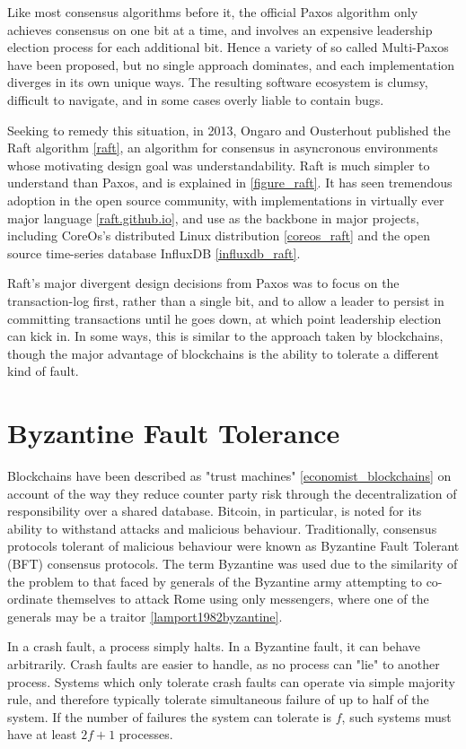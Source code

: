 Like most consensus algorithms before it, the official Paxos algorithm only achieves consensus on one bit at a time,
and involves an expensive leadership election process for each additional bit. 
Hence a variety of so called Multi-Paxos have been proposed, but no single approach dominates, 
and each implementation diverges in its own unique ways. 
The resulting software ecosystem is clumsy, difficult to navigate, and in some cases overly liable to contain bugs.

Seeking to remedy this situation, in 2013, Ongaro and Ousterhout published the Raft algorithm \ref{raft},
an algorithm for consensus in asyncronous environments whose motivating design goal was understandability.
Raft is much simpler to understand than Paxos, and is explained in \ref{figure_raft}. 
It has seen tremendous adoption in the open source community, with implementations in virtually ever major language \ref{raft.github.io},
and use as the backbone in major projects, including CoreOs's distributed Linux distribution \ref{coreos_raft} and the open source time-series database InfluxDB \ref{influxdb_raft}.

Raft's major divergent design decisions from Paxos was to focus on the transaction-log first, rather than a single bit,
and to allow a leader to persist in committing transactions until he goes down, at which point leadership election can kick in. 
In some ways, this is similar to the approach taken by blockchains, 
though the major advantage of blockchains is the ability to tolerate a different kind of fault.

\section{Byzantine Fault Tolerance}

Blockchains have been described as "trust machines" \ref{economist_blockchains} on account of the way they reduce counter party risk through the decentralization of responsibility over a shared database.
Bitcoin, in particular, is noted for its ability to withstand attacks and malicious behaviour. 
Traditionally, consensus protocols tolerant of malicious behaviour were known as Byzantine Fault Tolerant (BFT) consensus protocols.
The term Byzantine was used due to the similarity of the problem to that faced by generals of the Byzantine army attempting to co-ordinate themselves to attack Rome using only messengers,
where one of the generals may be a traitor \ref{lamport1982byzantine}.

In a crash fault, a process simply halts. In a Byzantine fault, it can behave arbitrarily.
Crash faults are easier to handle, as no process can "lie" to another process.
Systems which only tolerate crash faults can operate via simple majority rule, 
and therefore typically tolerate simultaneous failure of up to half of the system.
If the number of failures the system can tolerate is $f$, such systems must have at least $2f+1$ processes.

